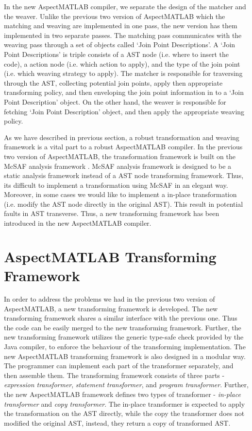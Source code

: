 \documentclass{comp621}
\begin{document}
In the new AspectMATLAB compiler, we separate the design of the matcher and the
weaver. Unlike the previous two version of AspectMATLAB which the matching and
weaving are implemented in one pass, the new version has them implemented in
two separate passes. The matching pass communicates with the weaving pass
through a set of objects called `Join Point Descriptions'. A `Join Point
Descriptions' is triple consists of a AST node (i.e. where to insert the code),
 a action node (i.e. which action to apply), and the type of the join point
(i.e. which weaving strategy to apply). The matcher is responsible for 
traversing through the AST, collecting potential join points, apply
then appropriate transforming policy, and then enveloping the join point
information in to a `Join Point Description' object. On the other hand, the
weaver is responsible for fetching `Join Point Description' object, and then
apply the appropriate weaving policy.

As we have described in previous section, a robust transformation and weaving
framework is a vital part to a robust AspectMATLAB compiler. In the previous
two version of AspectMATLAB, the transformation framework is built on the McSAF
analysis framework \cite{mcsaf_master_essay}. McSAF analysis framework is
designed to be a static analysis framework instead of a AST node transforming
framework. Thus, its difficult to implement a transformation using McSAF in an
elegant way. Moreover, in some cases we would like to implement a in-place
transformation (i.e. modify the AST node directly in the original AST). This
result in potential faults in AST transverse. Thus, a new transforming
framework has been introduced in the new AspectMATLAB compiler.

\section{AspectMATLAB Transforming Framework}
In order to address the problems we had in the previous two version of
AspectMATLAB, a new transforming framework is developed. The new transforming
framework shares a similar interface with the previous one. Thus the code can
be easily merged to the new transforming framework. Further, the new
transforming framework utilizes the generic type-safe check provided by the
Java compiler, to enforce the behaviour of the transforming implementation. The
new AspectMATLAB transforming framework is also designed in a modular way. The
programmer can implement each part of the transformer separately, and then
assemble them. The transforming framework consists of three parts -
\emph{expression transformer}, \emph{statement transformer}, and \emph{program
transformer}. Further, the new AspectMATLAB framework defines two types of
transformer - \emph{in-place transformer} and \emph{copy transformer}. The
in-place transformer is expected to apply the transformation on the AST
directly, while the copy the transformer does not modified the original AST,
instead, they return a copy of transformed AST. 
\end{document}
